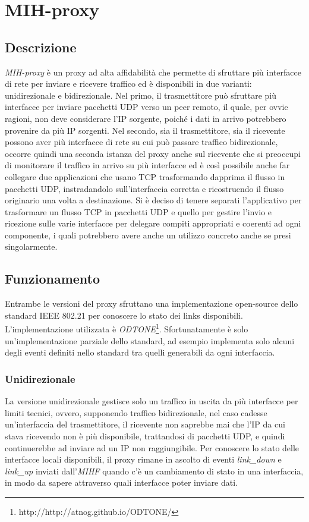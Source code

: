 \chapter{MIH-proxy}
\section{Descrizione}
{\em MIH-proxy} è un proxy ad alta affidabilità che permette di sfruttare più interfacce di rete per inviare e ricevere traffico ed è disponibili in due varianti: unidirezionale e bidirezionale. Nel primo, il trasmettitore può sfruttare più interfacce per inviare pacchetti UDP verso un peer remoto, il quale, per ovvie ragioni, non deve considerare l'IP sorgente, poiché i dati in arrivo potrebbero provenire da più IP sorgenti. Nel secondo, sia il trasmettitore, sia il ricevente possono aver più interfacce di rete su cui può passare traffico bidirezionale, occorre quindi una seconda istanza del proxy anche sul ricevente che si preoccupi di monitorare il traffico in arrivo su più interfacce ed è così possibile anche far collegare due applicazioni che usano TCP trasformando dapprima il flusso in pacchetti UDP, instradandolo sull'interfaccia corretta e ricostruendo il flusso originario una volta a destinazione. Si è deciso di tenere separati l'applicativo per trasformare un flusso TCP in pacchetti UDP e quello per gestire l'invio e ricezione sulle varie interfacce per delegare compiti appropriati e coerenti ad ogni componente, i quali potrebbero avere anche un utilizzo concreto anche se presi singolarmente.
\section{Funzionamento}
Entrambe le versioni del proxy sfruttano una implementazione open-source dello standard IEEE 802.21 per conoscere lo stato dei links disponibili. L'implementazione utilizzata è {\em ODTONE}\footnote{http://http://atnog.github.io/ODTONE/}. Sfortunatamente è solo un'implementazione parziale dello standard, ad esempio implementa solo alcuni degli eventi definiti nello standard tra quelli generabili da ogni interfaccia. 
\subsection{Unidirezionale}
La versione unidirezionale gestisce solo un traffico in uscita da più interfacce per limiti tecnici, ovvero, supponendo traffico bidirezionale, nel caso cadesse un'interfaccia del trasmettitore, il ricevente non saprebbe mai che l'IP da cui stava ricevendo non è più disponibile, trattandosi di pacchetti UDP, e quindi continuerebbe ad inviare ad un IP non raggiungibile. Per conoscere lo stato delle interfacce locali disponibili, il proxy rimane in ascolto di eventi {\em link\_down} e {\em link\_up} inviati dall'{\em MIHF} quando c'è un cambiamento di stato in una interfaccia, in modo da sapere attraverso quali interfacce poter inviare dati. 
